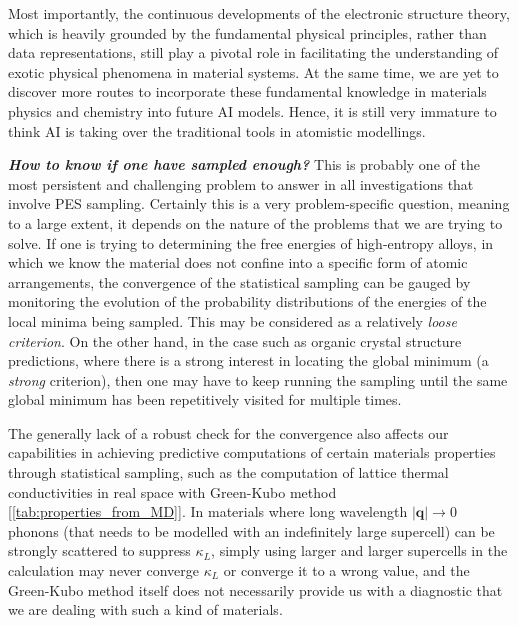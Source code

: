 Most importantly, the continuous developments of the electronic structure theory, which is heavily grounded by the fundamental physical principles, rather than data representations, still play a pivotal role in facilitating the understanding of exotic physical phenomena in material systems. At the same time, we are yet to discover more routes to incorporate these fundamental knowledge in materials physics and chemistry into future AI models. Hence, it is still very immature to think AI is taking over the traditional tools in atomistic modellings.  

\textit{\textbf{How to know if one have sampled enough?}} This is probably one of the most persistent and challenging problem to answer in all investigations that involve PES sampling. Certainly this is a very problem-specific question, meaning to a large extent, it depends on the nature of the problems that we are trying to solve. If one is trying to determining the free energies of high-entropy alloys, in which we know the material does not confine into a specific form of atomic arrangements, the convergence of the statistical sampling can be gauged by monitoring the evolution of the probability distributions of the energies of the local minima being sampled. This may be considered as a relatively \emph{loose criterion}. On the other hand, in the case such as organic crystal structure predictions,\cite{case2016convergence}  where there is a strong interest in locating the global minimum (a \emph{strong} criterion), then one may have to keep running the sampling until the same global minimum has been repetitively visited for multiple times. 

The generally lack of a robust check for the convergence also affects our capabilities in achieving predictive computations of certain materials properties through statistical sampling, such as the computation of lattice thermal conductivities in real space with Green-Kubo method [\cref{tab:properties_from_MD}].\cite{knoop2023ab} In materials where long wavelength $|\bm{q}|\to 0$ phonons (that needs to be modelled with an indefinitely large supercell) can be  strongly scattered  to suppress $\kappa_L$, simply using larger and larger supercells in the calculation may never converge $\kappa_L$ or converge it to a wrong value, and the Green-Kubo method itself does not necessarily provide us with a diagnostic that we are dealing with such a kind of materials.  

